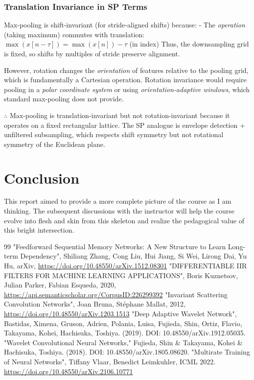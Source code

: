 \documentclass[12pt]{article}
\begin{document}
\subsubsection*{Translation Invariance in SP Terms}

Max-pooling is shift-invariant (for stride-aligned shifts) because:
- The \textit{operation} (taking maximum) commutes with translation: $\max(x[n - \tau]) = \max(x[n]) - \tau$ (in index)
Thus, the downsampling grid is fixed, so shifts by multiples of stride preserve alignment.

However, rotation changes the \textit{orientation} of features relative to the pooling grid, which is fundamentally a Cartesian operation. Rotation invariance would require pooling in a \textit{polar coordinate system} or using \textit{orientation-adaptive windows}, which standard max-pooling does not provide.

$\therefore$ Max-pooling is translation-invariant but not rotation-invariant because it operates on a fixed rectangular lattice. The SP analogue is envelope detection + unfiltered subsampling, which respects shift symmetry but not rotational symmetry of the Euclidean plane.

\section{Conclusion}
This report aimed to provide a more complete picture of the course as I am thinking. The subsequent discussions with the instructor will help the course evolve into flesh and skin from this skeleton and realize the pedagogical value of this bright intersection.

\begin{thebibliography}{99}
     "Feedforward Sequential Memory Networks: A New Structure to Learn Long-term Dependency", Shiliang Zhang, Cong Liu, Hui Jiang, Si Wei, Lirong Dai, Yu Hu, arXiv, \url{https://doi.org/10.48550/arXiv.1512.08301}
    "DIFFERENTIABLE IIR FILTERS FOR MACHINE LEARNING APPLICATIONS", Boris Kuznetsov, Julian Parker, Fabian Esqueda, 2020,
    \url{https://api.semanticscholar.org/CorpusID:226299392}
     "Invariant Scattering Convolution Networks", Joan Bruna, Stéphane Mallat, 2012, \url{https://doi.org/10.48550/arXiv.1203.1513}
     "Deep Adaptive Wavelet Network", Bastidas, Ximena, Gruson, Adrien, Polania, Luisa, Fujieda, Shin, Ortiz, Flavio, Takayama, Kohei, Hachisuka, Toshiya. (2019). DOI: 10.48550/arXiv.1912.05035. 
     "Wavelet Convolutional Neural Networks," Fujieda, Shin \& Takayama, Kohei \& Hachisuka, Toshiya. (2018).  DOI: 10.48550/arXiv.1805.08620. 
     "Multirate Training of Neural Networks", Tiffany Vlaar, Benedict Leimkuhler, ICML 2022. \url{https://doi.org/10.48550/arXiv.2106.10771}
\end{thebibliography}
\end{document}
